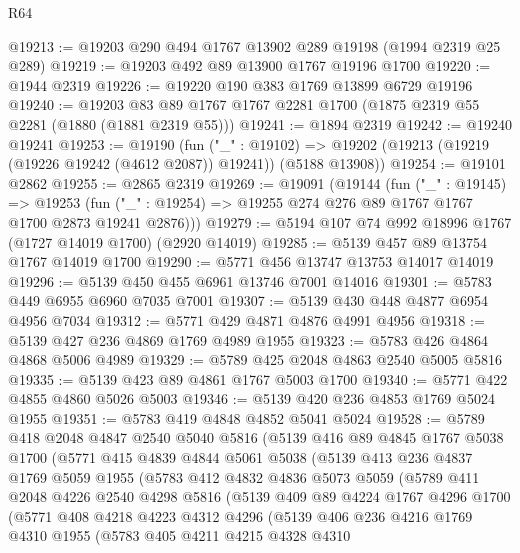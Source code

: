 \begin{lexlean}{R64}
\begin{coremodule}
@19213 := @19203 @290 @494 @1767 @13902 @289 @19198 (@1994 @2319 @25 @289)
@19219 := @19203 @492 @89 @13900 @1767 @19196 @1700
@19220 := @1944 @2319
@19226 := @19220 @190 @383 @1769 @13899 @6729 @19196
@19240 := @19203 @83 @89 @1767 @1767 @2281 @1700 (@1875 @2319 @55 @2281 (@1880 (@1881 @2319 @55)))
@19241 := @1894 @2319
@19242 := @19240 @19241
@19253 := @19190
    (fun ("_" : @19102) =>
    @19202 (@19213 (@19219 (@19226 @19242 (@4612 @2087)) @19241)) (@5188 @13908))
@19254 := @19101 @2862
@19255 := @2865 @2319
@19269 := @19091
    (@19144
      (fun ("_" : @19145) =>
      @19253 (fun ("_" : @19254) => @19255 @274 @276 @89 @1767 @1767 @1700 @2873 @19241 @2876)))
@19279 := @5194 @107 @74 @992 @18996 @1767 (@1727 @14019 @1700) (@2920 @14019)
@19285 := @5139 @457 @89 @13754 @1767 @14019 @1700
@19290 := @5771 @456 @13747 @13753 @14017 @14019
@19296 := @5139 @450 @455 @6961 @13746 @7001 @14016
@19301 := @5783 @449 @6955 @6960 @7035 @7001
@19307 := @5139 @430 @448 @4877 @6954 @4956 @7034
@19312 := @5771 @429 @4871 @4876 @4991 @4956
@19318 := @5139 @427 @236 @4869 @1769 @4989 @1955
@19323 := @5783 @426 @4864 @4868 @5006 @4989
@19329 := @5789 @425 @2048 @4863 @2540 @5005 @5816
@19335 := @5139 @423 @89 @4861 @1767 @5003 @1700
@19340 := @5771 @422 @4855 @4860 @5026 @5003
@19346 := @5139 @420 @236 @4853 @1769 @5024 @1955
@19351 := @5783 @419 @4848 @4852 @5041 @5024
@19528 := @5789
    @418
    @2048
    @4847
    @2540
    @5040
    @5816
    (@5139
      @416
      @89
      @4845
      @1767
      @5038
      @1700
      (@5771
        @415
        @4839
        @4844
        @5061
        @5038
        (@5139
          @413
          @236
          @4837
          @1769
          @5059
          @1955
          (@5783
            @412
            @4832
            @4836
            @5073
            @5059
            (@5789
              @411
              @2048
              @4226
              @2540
              @4298
              @5816
              (@5139
                @409
                @89
                @4224
                @1767
                @4296
                @1700
                (@5771
                  @408
                  @4218
                  @4223
                  @4312
                  @4296
                  (@5139
                    @406
                    @236
                    @4216
                    @1769
                    @4310
                    @1955
                    (@5783
                      @405
                      @4211
                      @4215
                      @4328
                      @4310

\end{coremodule}
\end{lexlean}
